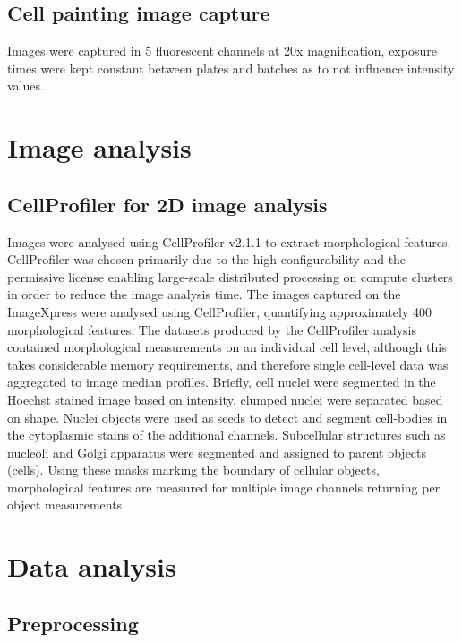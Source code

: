 \documentclass[a4paper,11pt,twoside,openright]{scrbook}
\begin{document}
\subsection{Cell painting image capture}

Images were captured in 5 fluorescent channels at 20x magnification, exposure times were kept constant between plates 
and batches as to not influence intensity values.


\section{Image analysis}


\subsection{CellProfiler for 2D image analysis}

Images were analysed using CellProfiler v2.1.1 to extract morphological features.
CellProfiler \cite{Carpenter2006} was chosen primarily due to the high configurability and the permissive license 
enabling large-scale distributed processing on compute clusters in order to reduce the image analysis time.
The images captured on the ImageXpress were analysed using CellProfiler, quantifying approximately 400 morphological 
features.
The datasets produced by the CellProfiler analysis contained morphological measurements on an individual cell level, 
although this takes considerable memory requirements, and therefore single cell-level data was aggregated to image 
median profiles.
Briefly, cell nuclei were segmented in the Hoechst stained image based on intensity, clumped nuclei were separated 
based on shape.
Nuclei objects were used as seeds to detect and segment cell-bodies in the cytoplasmic stains of the additional 
channels.
Subcellular structures such as nucleoli and Golgi apparatus were segmented and assigned to parent objects (cells).
Using these masks marking the boundary of cellular objects, morphological features are measured for multiple image 
channels returning per object measurements.


\section{Data analysis}


\subsection{Preprocessing}
\end{document}

